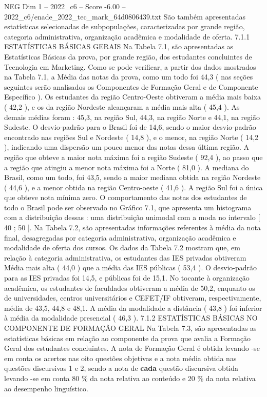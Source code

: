 \begin{textsample}{NEG Dim 1 – 2022\_c6 – Score -6.00 – 2022\_c6/enade\_2022\_tec\_mark\_64d0806439.txt}
São também apresentadas estatísticas selecionadas de subpopulações, caracterizadas por grande região, categoria administrativa, organização acadêmica e modalidade de oferta. 7.1.1 ESTATÍSTICAS BÁSICAS GERAIS Na Tabela 7.1, são apresentadas as Estatísticas Básicas da prova, por grande região, dos estudantes concluintes de Tecnologia em Marketing.
Como se pode verificar, a partir dos dados mostrados na Tabela 7.1, a Média das notas da prova, como um todo foi 44,3 ( nas seções seguintes serão analisados os Componentes de Formação Geral e de Componente Específico ).
Os estudantes da região Centro-Oeste obtiveram a média mais baixa ( 42,2 ), e os da região Nordeste alcançaram a média mais alta ( 45,4 ).
As demais médias foram : 45,3, na região Sul, 44,3, na região Norte e 44,1, na região Sudeste.
O desvio-padrão para o Brasil foi de 14,6, sendo o maior desvio-padrão encontrado nas regiões Sul e Nordeste ( 14,8 ), e o menor, na região Norte ( 14,2 ), indicando uma dispersão um pouco menor das notas dessa última região.
A região que obteve a maior nota máxima foi a região Sudeste ( 92,4 ), ao passo que a região que atingiu a menor nota máxima foi a Norte ( 81,0 ).
A mediana do Brasil, como um todo, foi 43,5, sendo a maior mediana obtida na região Nordeste ( 44,6 ), e a menor obtida na região Centro-oeste ( 41,6 ).
A região Sul foi a única que obteve nota mínima zero.
O comportamento das notas dos estudantes de todo o Brasil pode ser observado no Gráfico 7.1, que apresenta um histograma com a distribuição dessas : uma distribuição unimodal com a moda no intervalo [ 40 ; 50 ].
Na Tabela 7.2, são apresentadas informações referentes à média da nota final, desagregadas por categoria administrativa, organização acadêmica e modalidade de oferta dos cursos.
Os dados da Tabela 7.2 mostram que, em relação à categoria administrativa, os estudantes das IES privadas obtiveram Média mais alta ( 44,0 ) que a média das IES públicas ( 53,4 ).
O desvio-padrão para as IES privadas foi 14,5, e públicas foi de 15,1.
No tocante à organização acadêmica, os estudantes de faculdades obtiveram a média de 50,2, enquanto os de universidades, centros universitários e CEFET/IF obtiveram, respectivamente, média de 43,5, 44,8 e 48,1.
A média da modalidade a distância ( 43,8 ) foi inferior à média da modalidade presencial ( 46,3 ). 7.1.2 ESTATÍSTICAS BÁSICAS NO COMPONENTE DE FORMAÇÃO GERAL Na Tabela 7.3, são apresentadas as estatísticas básicas em relação ao componente da prova que avalia a Formação Geral dos estudantes concluintes.
A nota de Formação Geral é obtida levando -se em conta os acertos nas oito questões objetivas e a nota média obtida nas questões discursivas 1 e 2, sendo a nota de \textbf{cada} questão discursiva obtida levando -se em conta 80 \% da nota relativa ao conteúdo e 20 \% da nota relativa ao desempenho linguístico.

\end{textsample}

